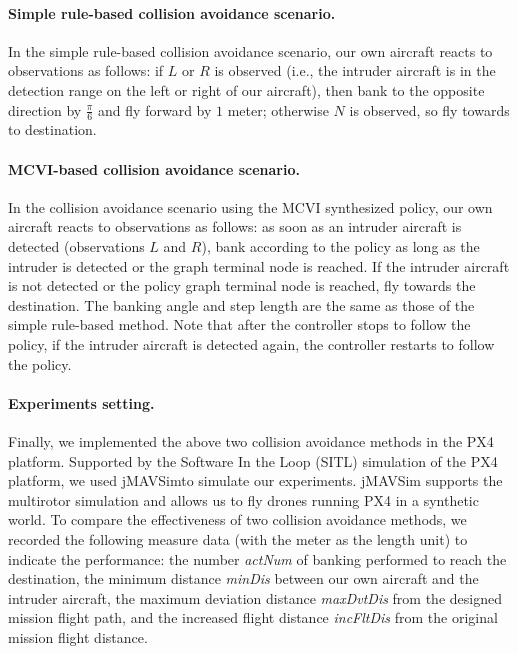 \documentclass[orivec]{llncs}
\newcommand{\jMAVSim}{\textsf{jMAVSim}}
\begin{document}
\paragraph*{Simple rule-based collision avoidance scenario.}
In the simple rule-based collision avoidance scenario, our own aircraft reacts to observations as follows:
if $L$ or $R$ is observed (i.e., the intruder aircraft is in the detection range on the left or right of our aircraft), then bank to the opposite direction by $\frac{\pi}{6}$ and fly forward by $1$ meter;
otherwise $N$ is observed, so fly towards to destination.

\paragraph*{MCVI-based collision avoidance scenario.}
In the collision avoidance scenario using the MCVI synthesized policy, our own aircraft reacts to observations as follows:
as soon as an intruder aircraft is detected (observations $L$ and $R$), bank according to the policy as long as the intruder is detected or the graph terminal node is reached.
If the intruder aircraft is not detected or the policy graph terminal node is reached, fly towards the destination.
The banking angle and step length are the same as those of the simple rule-based method.
Note that after the controller stops to follow the policy, if the intruder aircraft is detected again, the controller restarts to follow the policy. 

\paragraph*{Experiments setting.}
Finally, we implemented the above two collision avoidance methods in the PX4 platform.
Supported by the \textsf{Software In the Loop} (SITL) simulation of the PX4 platform, we used \jMAVSim to  simulate our experiments. 
\jMAVSim{} supports the multirotor simulation and allows us to fly drones running PX4 in a synthetic world. 
To compare the effectiveness of two collision avoidance methods, we recorded the following measure data (with the meter as the length unit) to indicate the performance:
the number \emph{actNum} of banking performed to reach the destination,
the minimum distance \emph{minDis} between our own aircraft and the intruder aircraft,
the maximum deviation distance \emph{maxDvtDis} from the designed mission flight path, and
the increased flight distance \emph{incFltDis} from the original mission flight distance.
\end{document}
